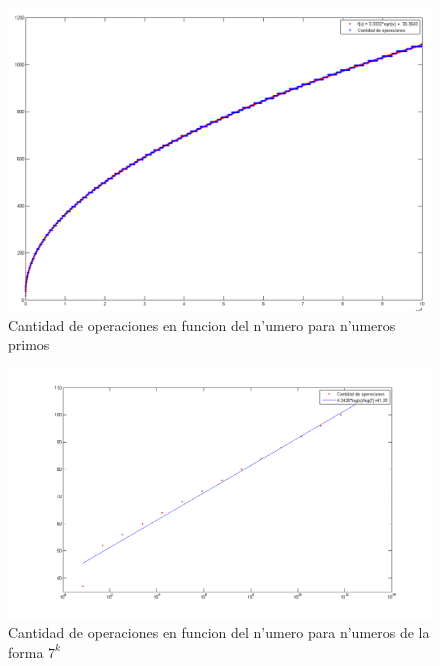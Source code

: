 \begin{figure}[H]
\centering
\includegraphics[scale=0.5]{../../codigo/ejercicio1/benchmark/graficos/primos/graficoPrimos.png}
\caption{Cantidad de operaciones en funcion del n'umero para n'umeros primos}
\end{figure}

\begin{figure}[H]
\centering
\includegraphics[scale=0.5]{../../codigo/ejercicio1/benchmark/graficos/potencias_de_7/graficoPotenciasDe7.png}
\caption{Cantidad de operaciones en funcion del n'umero para n'umeros de la forma $7^k$}
\end{figure}

